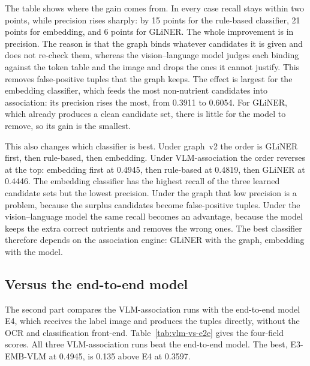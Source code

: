 The table shows where the gain comes from. In every case recall stays
within two points, while precision rises sharply: by 15 points for the
rule-based classifier, 21 points for embedding, and 6 points for GLiNER.
The whole improvement is in precision. The reason is that the graph binds
whatever candidates it is given and does not re-check them, whereas the
vision--language model judges each binding against the token table and the
image and drops the ones it cannot justify. This removes false-positive
tuples that the graph keeps. The effect is largest for the embedding
classifier, which feeds the most non-nutrient candidates into association:
its precision rises the most, from 0.3911 to 0.6054. For GLiNER, which
already produces a clean candidate set, there is little for the model to
remove, so its gain is the smallest.

This also changes which classifier is best. Under graph~v2 the order is
GLiNER first, then rule-based, then embedding. Under VLM-association the
order reverses at the top: embedding first at 0.4945, then rule-based at
0.4819, then GLiNER at 0.4446. The embedding classifier has the highest
recall of the three learned candidate sets but the lowest precision. Under
the graph that low precision is a problem, because the surplus candidates
become false-positive tuples. Under the vision--language model the same
recall becomes an advantage, because the model keeps the extra correct
nutrients and removes the wrong ones. The best classifier therefore
depends on the association engine: GLiNER with the graph, embedding with
the model.

\subsection{Versus the end-to-end model}\label{sec:exp-vlm-e2e}

The second part compares the VLM-association runs with the end-to-end model
E4, which receives the label image and produces the tuples directly,
without the OCR and classification front-end. Table~\ref{tab:vlm-vs-e2e}
gives the four-field scores. All three VLM-association runs beat the
end-to-end model. The best, E3-EMB-VLM at 0.4945, is 0.135 above E4 at
0.3597.

